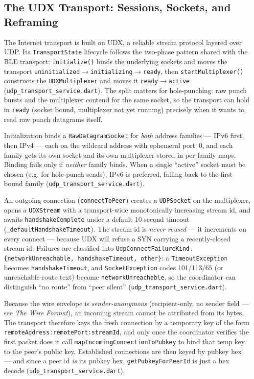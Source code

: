 \documentclass[11pt]{report}
\newcommand{\code}[1]{\texttt{\small #1}}
\begin{document}
\subsection{The UDX Transport: Sessions, Sockets, and Reframing}

The Internet transport is built on UDX, a reliable stream protocol layered over UDP. Its \code{TransportState} lifecycle follows the two-phase pattern shared with the BLE transport: \code{initialize()} binds the underlying sockets and moves the transport \code{uninitialized}$\rightarrow$\code{initializing}$\rightarrow$\code{ready}, then \code{startMultiplexer()} constructs the \code{UDXMultiplexer} and moves it \code{ready}$\rightarrow$\code{active} (\code{udp_transport_service.dart}). The split matters for hole-punching: raw punch bursts and the multiplexer contend for the same socket, so the transport can hold in \code{ready} (socket bound, multiplexer not yet running) precisely when it wants to read raw punch datagrams itself.

Initialization binds a \code{RawDatagramSocket} for \emph{both} address families --- IPv6 first, then IPv4 --- each on the wildcard address with ephemeral port~0, and each family gets its own socket and its own multiplexer stored in per-family maps. Binding fails only if \emph{neither} family binds. When a single ``active'' socket must be chosen (e.g. for hole-punch sends), IPv6 is preferred, falling back to the first bound family (\code{udp_transport_service.dart}).

An outgoing connection (\code{connectToPeer}) creates a \code{UDPSocket} on the multiplexer, opens a \code{UDXStream} with a transport-wide monotonically increasing stream id, and awaits \code{handshakeComplete} under a default 10-second timeout (\code{\_defaultHandshakeTimeout}). The stream id is \emph{never reused} --- it increments on every connect --- because UDX will refuse a SYN carrying a recently-closed stream id. Failures are classified into \code{UdpConnectFailureKind.\{networkUnreachable, handshakeTimeout, other\}}: a \code{TimeoutException} becomes \code{handshakeTimeout}, and \code{SocketException} codes 101/113/65 (or unreachable-route text) become \code{networkUnreachable}, so the coordinator can distinguish ``no route'' from ``peer silent'' (\code{udp_transport_service.dart}).

Because the wire envelope is \emph{sender-anonymous} (recipient-only, no sender field --- see \emph{The Wire Format}), an incoming stream cannot be attributed from its bytes. The transport therefore keys the fresh connection by a temporary key of the form \code{remoteAddress:remotePort:streamId}, and only once the coordinator verifies the first packet does it call \code{mapIncomingConnectionToPubkey} to bind that temp key to the peer's public key. Established connections are then keyed by pubkey hex --- and since a peer id \emph{is} its pubkey hex, \code{getPubkeyForPeerId} is just a hex decode (\code{udp_transport_service.dart}).
\end{document}
